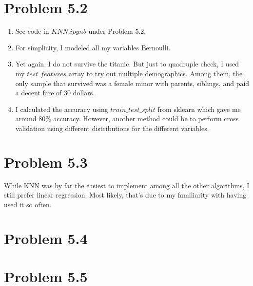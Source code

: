 \documentclass{article}
\begin{document}
\section*{Problem 5.2}
\begin{enumerate}[label=(\alph*)]
  \item See code in $KNN.ipynb$ under Problem 5.2.
  \item For simplicity, I modeled all my variables Bernoulli.
  \item Yet again, I do not survive the titanic. But just to quadruple check, I used my $test\_features$ array to try out multiple demographics. Among them, the only sample that survived was a female minor with parents, siblings, and paid a decent fare of 30 dollars.
  \item I calculated the accuracy using $train\_test\_split$ from sklearn which gave me around 80\% accuracy. However, another method could be to perform cross validation using different distributions for the different variables.
\end{enumerate}

\section*{Problem 5.3}

While KNN was by far the easiest to implement among all the other algorithms, I still prefer linear regression. Most likely, that's due to my familiarity with having used it so often.

\section*{Problem 5.4}



\section*{Problem 5.5}
\end{document}
